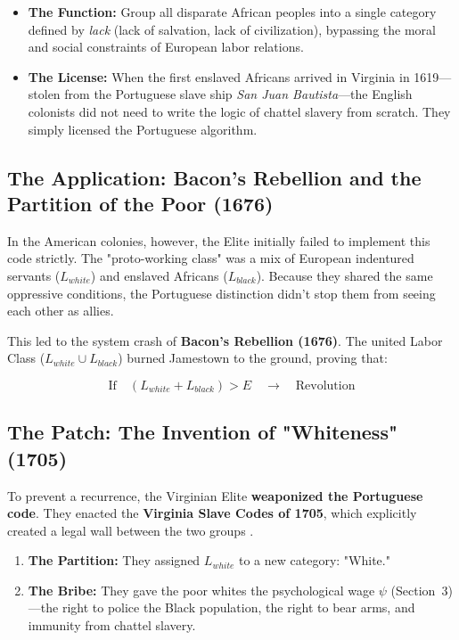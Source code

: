 \documentclass[12pt]{article}
\begin{document}
\begin{itemize}
    \item \textbf{The Function:} Group all disparate African peoples into a single category defined by \textit{lack} (lack of salvation, lack of civilization), bypassing the moral and social constraints of European labor relations.
    \item \textbf{The License:} When the first enslaved Africans arrived in Virginia in 1619---stolen from the Portuguese slave ship \textit{San Juan Bautista}---the English colonists did not need to write the logic of chattel slavery from scratch. They simply licensed the Portuguese algorithm.
\end{itemize}

\subsection{The Application: Bacon's Rebellion and the Partition of the Poor (1676)}
In the American colonies, however, the Elite initially failed to implement this code strictly. The "proto-working class" was a mix of European indentured servants ($L_{white}$) and enslaved Africans ($L_{black}$). Because they shared the same oppressive conditions, the Portuguese distinction didn't stop them from seeing each other as allies.

This led to the system crash of \textbf{Bacon's Rebellion (1676)}. The united Labor Class ($L_{white} \cup L_{black}$) burned Jamestown to the ground, proving that:

\[
\text{If} \quad (L_{white} + L_{black}) > E \quad \rightarrow \quad \text{Revolution}
\]

\subsection{The Patch: The Invention of "Whiteness" (1705)}
To prevent a recurrence, the Virginian Elite \textbf{weaponized the Portuguese code}. They enacted the \textbf{Virginia Slave Codes of 1705}, which explicitly created a legal wall between the two groups \cite{allen, kendi}.

\begin{enumerate}
    \item \textbf{The Partition:} They assigned $L_{white}$ to a new category: "White."
    \item \textbf{The Bribe:} They gave the poor whites the psychological wage $\psi$ (Section~3)---the right to police the Black population, the right to bear arms, and immunity from chattel slavery.
\end{enumerate}
\end{document}
